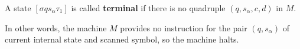 A state $[\sigma q s_\alpha \tau_1]$ is called \textbf{terminal} if there is no quadruple $(q, s_\alpha, c, d)$ in $M$.

In other words, the machine $M$ provides no instruction for the pair $(q, s_\alpha)$ of current internal state and scanned symbol, so the machine halts.
